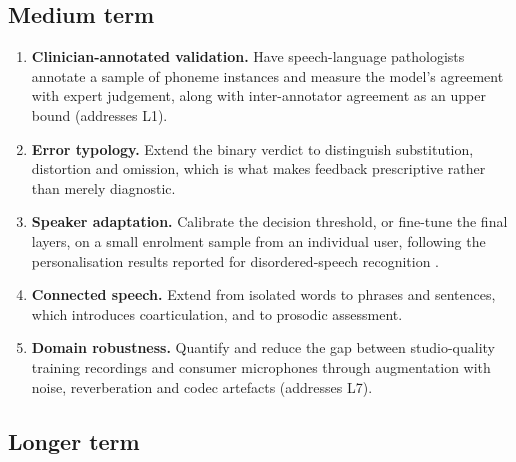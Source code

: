 \subsection{Medium term}

\begin{enumerate}[leftmargin=*, resume]
  \item \textbf{Clinician-annotated validation.} Have speech-language
        pathologists annotate a sample of phoneme instances and measure the
        model's agreement with expert judgement, along with inter-annotator
        agreement as an upper bound (addresses L1).
  \item \textbf{Error typology.} Extend the binary verdict to distinguish
        substitution, distortion and omission, which is what makes feedback
        prescriptive rather than merely diagnostic.
  \item \textbf{Speaker adaptation.} Calibrate the decision threshold, or
        fine-tune the final layers, on a small enrolment sample from an
        individual user, following the personalisation results reported for
        disordered-speech recognition \cite{macdonald2021disordered}.
  \item \textbf{Connected speech.} Extend from isolated words to phrases and
        sentences, which introduces coarticulation, and to prosodic assessment.
  \item \textbf{Domain robustness.} Quantify and reduce the gap between
        studio-quality training recordings and consumer microphones through
        augmentation with noise, reverberation and codec artefacts
        (addresses L7).
\end{enumerate}

\subsection{Longer term}

